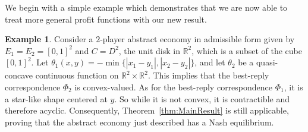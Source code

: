 \documentclass[a4paper,11pt,reqno,english]{amsart}
\theoremstyle{definition}
\newtheorem{example}[theorem]{Example}
\begin{document}
\medskip
We begin with a simple example which demonstrates that we are now able to treat more general profit functions with our new result.

\begin{example}
	Consider a $2$-player abstract economy in admissible form given by $E_1 = E_2 = [0, 1]^2$ and $C=D^2$, the unit disk in $\mathbb{R}^2$, which is a subset of the cube $[0, 1]^2$. Let $\theta_1(x, y) = -\min\{|x_1-y_1|, |x_2-y_2|\}$, and let $\theta_2$ be a quasi-concave continuous function on $\mathbb{R}^2\times\mathbb{R}^2$. This implies that the best-reply correspondence $\Phi_2$ is convex-valued.
	As for the best-reply correspondence $\Phi_1$, it is a star-like shape centered at $y$. So while it is not convex, it is contractible and therefore acyclic. Consequently, Theorem~\ref{thm:MainResult} is still applicable, proving that the abstract economy just described has a Nash equilibrium.
\end{example}
\end{document}
